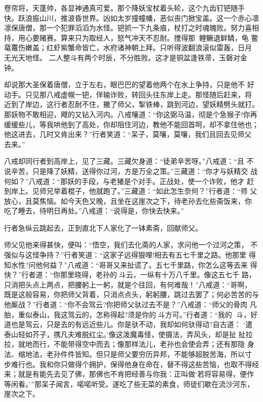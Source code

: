 卷帘将，天蓬帅，各显神通真可爱。那个降妖宝杖着头轮，这个九齿钉钯随手
快。跃浪振山川，推波昏世界。凶如太岁撞幢幡，恶似丧门掀宝盖。这一个赤心凛
凛保唐僧，那一个犯罪滔滔为水怪。钯抓一下九条痕，杖打之时魂魄败。努力喜相
持，用心要赌赛。算来只为取经人，怒气冲天不忍耐。搅得那鲤鳜退鲜鳞，龟
鳖鼋鼍伤嫩盖；红虾紫蟹命皆亡，水府诸神朝上拜。只听得波翻浪滚似雷轰，日月
无光天地怪。
二人整斗有两个时辰，不分胜败。这才是铜盆逢铁帚，玉磬对金钟。

却说那大圣保着唐僧，立于左右，眼巴巴的望着他两个在水上争持，只是他不
好动手。只见那八戒虚幌一钯，佯输诈败，转回头往东岸上走。那怪随后赶来，将
近到了岸边，这行者忍耐不住，撇了师父，掣铁棒，跳到河边，望妖精劈头就打。
那妖物不敢相迎，飕的又钻入河内。八戒嚷道：“你这弼马温，彻是个急猴子!你再
缓缓些儿，等我哄他到了高处，你却阻住河边，教他不能回首呵，却不拿住他也；
他这进去，几时又肯出来？”行者笑道：“呆子，莫嚷，莫嚷，我们且回去见师父
去来。”

八戒却同行者到高岸上，见了三藏。三藏欠身道：“徒弟辛苦呀。”八戒道：“且
不说辛苦，只是降了妖精，送得你过河，方是万全之策。”三藏道：“你才与妖精交
战何如？”八戒道：“那妖的手段，与老猪是个对手。正战处，使一个诈败，他才
赶到岸上。见师兄举着棍子，他就跑了。”三藏道：“如此怎生奈何？”行者道：“师
父放心，且莫焦恼。如今天色又晚，且坐在这崖次之下，待老孙去化些斋饭来，你
吃了睡去，待明日再处。”八戒道：“说得是，你快去快来。”

行者急纵云跳起去，正到直北下人家化了一钵素斋，回献师父。

师父见他来得甚快，便叫：“悟空，我们去化斋的人家，求问他一个过河之策，
不强似与这怪争持？”行者笑道：“这家子远得狠哩!相去有五七千里之路。他那里
得知水性?问他何益？”八戒道：“哥哥又来扯谎了。五七千里路，你怎么这等去来
得快？”行者道：“你那里晓得，老孙的斗云，一纵有十万八千里。像这五七千
路，只消把头点上两点，把腰躬上一躬，就是个往回，有何难哉！”八戒道：“哥啊，
既是这般容易，你把师父背着，只消点点头，躬躬腰，跳过去罢了；何必苦苦的与
他厮战？”行者道：“你不会驾云?你把师父驮过去不是？”八戒道：“师父的骨肉
凡胎，重似泰山，我这驾云的，怎称得起?须是你的斗方可。”行者道：“我的
斗，好道也是驾云，只是去的有远近些儿。你是驮不动，我却如何驮得动?自古道：
‘遣泰山轻如芥子，携凡夫难脱红尘。’像这泼魔毒怪，使摄法，弄风头，却是扯
扯拉拉，就地而行，不能带得空中而去；像那样法儿，老孙也会使会弄；还有那隐
身法、缩地法，老孙件件皆知。但只是师父要穷历异邦，不能够超脱苦海，所以寸
步难行也。我和你只做得个拥护，保得他身在命在，替不得这些苦恼，也取不得经
来；就是有能先去见了佛，那佛也不肯把经善与你我：正叫做‘若将容易得，便作
等闲看。’”那呆子闻言，喏喏听受。遂吃了些无菜的素食，师徒们歇在流沙河东，
崖次之下。

